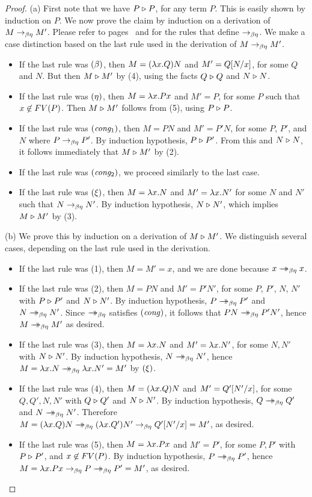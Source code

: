 \documentclass{article}
\begin{document}
\begin{proof}
  (a) First note that we have $P\mathrel{\triangleright} P$, for any term $P$. This is
  easily shown by induction on $P$. We now prove the claim by
  induction on a derivation of $M\rightarrow_{\beta\eta} M'$.  Please refer to
  pages~\pageref{page-def-beta} and {\pageref{page-def-eta}} for
  the rules that define $\rightarrow_{\beta\eta}$. We make a case distinction based on
  the last rule used in the derivation of $M\rightarrow_{\beta\eta} M'$.
  \begin{itemize}
  \item If the last rule was $\textrm{(\textit{$\beta$\/})}$, then $M=(\lambda x.Q)N$ and
    $M'=Q[N/x]$, for some $Q$ and $N$. But then $M\mathrel{\triangleright} M'$ by 
    (4), using the facts $Q\mathrel{\triangleright} Q$ and $N\mathrel{\triangleright} N$. 
  \item If the last rule was $\textrm{(\textit{$\eta$\/})}$, then $M=\lambda x.Px$ and
    $M'=P$, for some $P$ such that $x\not\in FV(P)$. Then $M\mathrel{\triangleright} M'$
    follows from (5), using $P\mathrel{\triangleright} P$.
  \item If the last rule was $\textrm{(\textit{cong$_1$\/})}$, then $M=PN$ and
    $M'=P'N$, for some $P$, $P'$, and $N$ where $P\rightarrow_{\beta\eta} P'$. By
    induction hypothesis, $P\mathrel{\triangleright} P'$. From this and $N\mathrel{\triangleright} N$, it
    follows immediately that $M\mathrel{\triangleright} M'$ by (2).
  \item If the last rule was $\textrm{(\textit{cong$_2$\/})}$, we proceed similarly
    to the last case.
  \item If the last rule was $\textrm{(\textit{$\xi$\/})}$, then $M=\lambda x.N$ and
    $M'=\lambda x.N'$ for some $N$ and $N'$ such that $N\rightarrow_{\beta\eta} N'$. By
    induction hypothesis, $N\mathrel{\triangleright} N'$, which implies $M\mathrel{\triangleright} M'$ by (3).
  \end{itemize}
  
  (b) We prove this by induction on a derivation of $M\mathrel{\triangleright} M'$. We
  distinguish several cases, depending on the last rule used in the
  derivation.
  \begin{itemize}
  \item If the last rule was (1), then $M=M'=x$, and we are done because
    $x\mathrel{\rightarrow\!\!\!\!\!\rightarrow}_{\beta\eta} x$.
  \item If the last rule was (2), then $M=PN$ and $M'=P'N'$, for some
    $P$, $P'$, $N$, $N'$ with $P\mathrel{\triangleright} P'$ and $N\mathrel{\triangleright} N'$. By induction
    hypothesis, $P\mathrel{\rightarrow\!\!\!\!\!\rightarrow}_{\beta\eta} P'$ and $N\mathrel{\rightarrow\!\!\!\!\!\rightarrow}_{\beta\eta} N'$. Since $\mathrel{\rightarrow\!\!\!\!\!\rightarrow}_{\beta\eta}$
    satisfies $\textrm{(\textit{cong\/})}$, it follows that $PN\mathrel{\rightarrow\!\!\!\!\!\rightarrow}_{\beta\eta} P'N'$, hence
    $M\mathrel{\rightarrow\!\!\!\!\!\rightarrow}_{\beta\eta} M'$ as desired.
  \item If the last rule was (3), then $M=\lambda x.N$ and $M'=\lambda
    x.N'$, for some $N,N'$ with $N\mathrel{\triangleright} N'$. By induction hypothesis,
    $N\mathrel{\rightarrow\!\!\!\!\!\rightarrow}_{\beta\eta} N'$, hence $M=\lambda x.N\mathrel{\rightarrow\!\!\!\!\!\rightarrow}_{\beta\eta} \lambda x.N'=M'$ by
    $\textrm{(\textit{$\xi$\/})}$. 
  \item If the last rule was (4), then $M=(\lambda x.Q)N$ and
    $M'=Q'[N'/x]$, for some $Q,Q',N,N'$ with $Q\mathrel{\triangleright} Q'$ and
    $N\mathrel{\triangleright} N'$. By induction hypothesis, $Q\mathrel{\rightarrow\!\!\!\!\!\rightarrow}_{\beta\eta} Q'$ and $N\mathrel{\rightarrow\!\!\!\!\!\rightarrow}_{\beta\eta}
    N'$. Therefore $M=(\lambda x.Q)N\mathrel{\rightarrow\!\!\!\!\!\rightarrow}_{\beta\eta}(\lambda x.Q')N'\rightarrow_{\beta\eta}
    Q'[N'/x]=M'$, as desired.
  \item If the last rule was (5), then $M=\lambda x.Px$ and $M'=P'$, for
    some $P,P'$ with $P\mathrel{\triangleright} P'$, and $x\not\in FV(P)$. By induction
    hypothesis, $P\mathrel{\rightarrow\!\!\!\!\!\rightarrow}_{\beta\eta} P'$, hence $M=\lambda x.Px\rightarrow_{\beta\eta} P\mathrel{\rightarrow\!\!\!\!\!\rightarrow}_{\beta\eta}
    P'=M'$, as desired.
  \end{itemize}
  

\end{proof}
\end{document}
